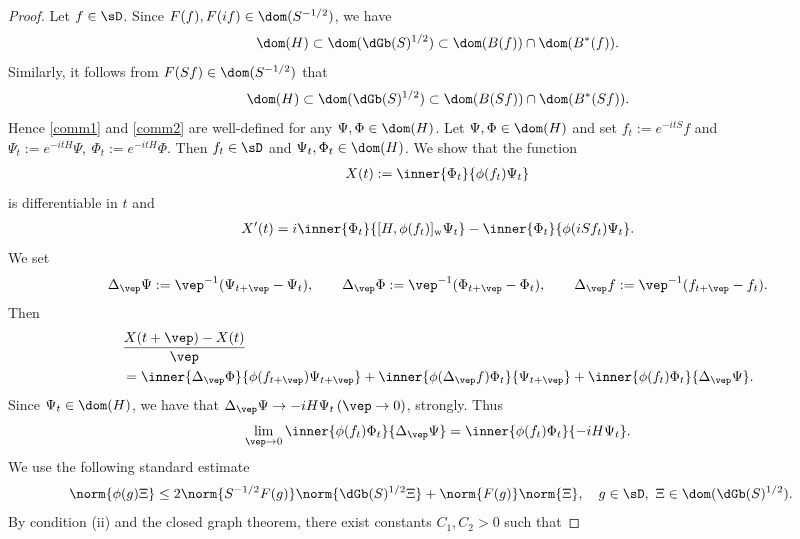 \documentclass[12pt]{article}
\theoremstyle{plain}
\numberwithin{equation}{section}
\theoremstyle{remark}
\begin{document}
\begin{proof}
Let $f\in\sD$.
Since $F(f), F(if)\in\dom(S^{-1/2})$, we have
\begin{equation}\label{dominc1}
 \dom(H)\subset\dom(\dGb(S)^{1/2}) \subset \dom(B(f)) \cap \dom(B^*(f)).
\end{equation}
Similarly, it follows from $F(Sf)\in\dom(S^{-1/2})$ that
\begin{equation}\label{dominc2}
 \dom(H)\subset\dom(\dGb(S)^{1/2}) \subset \dom(B(Sf)) \cap \dom(B^*(Sf)).
\end{equation}
Hence \eqref{comm1} and \eqref{comm2} are well-defined for any $\Psi,\Phi\in\dom(H)$.
Let $\Psi,\Phi\in\dom(H)$ and set 
$f_t:=e^{-itS}f$ and $\Psi_t:=e^{-itH}\Psi,~\Phi_t:=e^{-itH}\Phi$.
Then $f_t\in\sD$ and $\Psi_t, \Phi_t\in \dom(H)$.
We show that the function
\begin{align*}
  X(t) := \inner{\Phi_t}{\phi(f_t)\Psi_t}
\end{align*}
is differentiable in $t$ and
\begin{align}
 X'(t) 
 = i\inner{\Phi_t}{[H,\phi(f_t)]_\mathrm{w}\Psi_t}
   -\inner{\Phi_t}{\phi(iSf_t)\Psi_t}.   \label{eq:X'}
\end{align}
We set
\begin{align*}
\Delta_\vep\Psi := \vep^{-1}(\Psi_{t+\vep}-\Psi_t), \qquad
\Delta_\vep\Phi := \vep^{-1}(\Phi_{t+\vep}-\Phi_t), \qquad 
\Delta_\vep f := \vep^{-1}(f_{t+\vep}-f_t).
\end{align*}
Then
\begin{align*}
& \frac{X(t+\vep)-X(t)}{\vep} \\
& = \inner{\Delta_\vep\Phi}{\phi(f_{t+\vep})\Psi_{t+\vep}}
 + \inner{\phi(\Delta_\vep f)\Phi_t}{\Psi_{t+\vep}}
 + \inner{\phi(f_t)\Phi_t}{\Delta_\vep\Psi}.
\end{align*}
Since $\Psi_t\in\dom(H)$, 
we have that $\Delta_\vep\Psi\to -iH\Psi_t \, (\vep\to 0)$, strongly. Thus
\begin{align}
\lim_{\vep\to 0} \inner{\phi(f_t)\Phi_t}{\Delta_\vep\Psi}
 =\inner{\phi(f_t)\Phi_t}{-iH\Psi_t}.   \label{eqqxx1}
\end{align}
We use the following standard estimate
\begin{align}
& \norm{\phi(g)\Xi} \leq 2\norm{S^{-1/2}F(g)}  \norm{\dGb(S)^{1/2}\Xi}
  + \norm{F(g)} \norm{\Xi},
  \quad g\in\sD, ~ \Xi \in \dom(\dGb(S)^{1/2}). \label{stdineq}
\end{align}
By condition (ii) and the closed graph theorem, there exist constants $C_1,C_2>0$ such that 

\end{proof}
\end{document}

